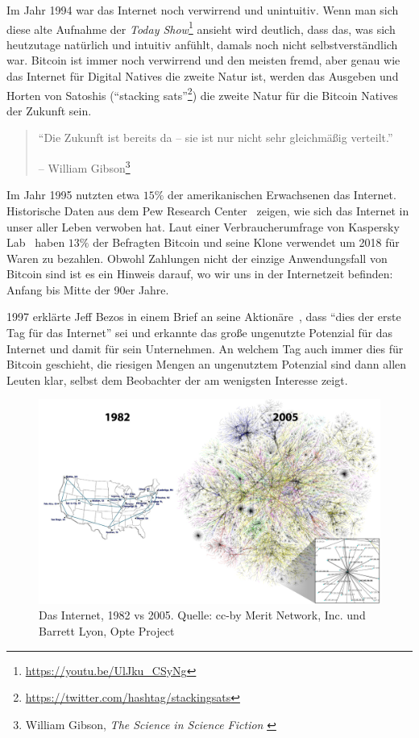 Im Jahr 1994 war das Internet noch verwirrend und unintuitiv. Wenn man sich
diese alte Aufnahme der \textit{Today
Show}\footnote{\url{https://youtu.be/UlJku_CSyNg}} ansieht wird deutlich, dass
das, was sich heutzutage natürlich und intuitiv anfühlt, damals noch nicht
selbstverständlich war. Bitcoin ist immer noch verwirrend und den meisten fremd,
aber genau wie das Internet für Digital Natives die zweite Natur ist, werden das
Ausgeben und Horten von Satoshis (\enquote{stacking
sats}\footnote{\url{https://twitter.com/hashtag/stackingsats}}) die zweite Natur
für die Bitcoin Natives der Zukunft sein.

\begin{quotation}\begin{samepage}
\enquote{Die Zukunft ist bereits da -- sie ist nur nicht sehr gleichmäßig
verteilt.} \begin{flushright} -- William Gibson\footnote{William Gibson,
\textit{The Science in Science Fiction} \cite{william-gibson}}
\end{flushright}\end{samepage}\end{quotation}

Im Jahr 1995 nutzten etwa $15\%$ der amerikanischen Erwachsenen das Internet.
Historische Daten aus dem Pew Research Center~\cite{pew-research} zeigen, wie
sich das Internet in unser aller Leben verwoben hat. Laut einer
Verbraucherumfrage von Kaspersky Lab~\cite{web:kaspersky} haben $13\%$ der
Befragten Bitcoin und seine Klone verwendet um 2018 für Waren zu bezahlen.
Obwohl Zahlungen nicht der einzige Anwendungsfall von Bitcoin sind ist es ein
Hinweis darauf, wo wir uns in der Internetzeit befinden: Anfang bis Mitte der
90er Jahre.

1997 erklärte Jeff Bezos in einem Brief an seine Aktionäre~\cite{bezos-letter},
dass \enquote{dies der erste Tag für das Internet} sei und erkannte das große
ungenutzte Potenzial für das Internet und damit für sein Unternehmen. An welchem
Tag auch immer dies für Bitcoin geschieht, die riesigen Mengen an ungenutztem
Potenzial sind dann allen Leuten klar, selbst dem Beobachter der am wenigsten
Interesse zeigt.

\begin{figure}
  \includegraphics{assets/images/internet-evolution-white-dates.png}
  \caption{Das Internet, 1982 vs 2005. Quelle: cc-by Merit Network, Inc. und
  Barrett Lyon, Opte Project}
  \label{fig:internet-evolution-white-dates}
\end{figure}


